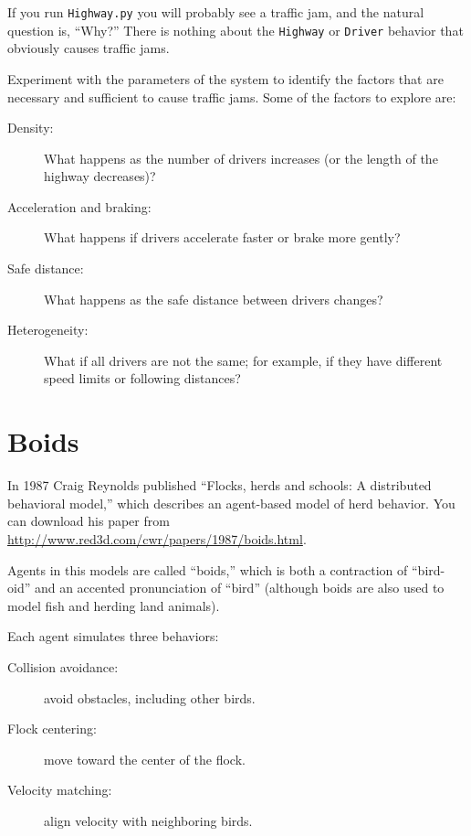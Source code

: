 \documentclass[10pt]{book}
\begin{document}
If you run {\tt Highway.py} you will probably see a traffic jam,
and the natural question is, ``Why?''  There is nothing about the
{\tt Highway} or {\tt Driver} behavior that obviously causes
traffic jams.

\begin{exercise}

Experiment with the parameters of the system to identify the factors
that are necessary and sufficient to cause traffic jams.  Some of
the factors to explore are:

\begin{description}

\item[Density:] What happens as the number of drivers increases (or
the length of the highway decreases)?

\item[Acceleration and braking:]  What happens if drivers accelerate
faster or brake more gently?

\item[Safe distance:] What happens as the safe distance between drivers
changes?

\item[Heterogeneity:] What if all drivers are not the same; for
example, if they have different speed limits or following distances?

\end{description}

\end{exercise}


\section{Boids}

In 1987 Craig Reynolds published ``Flocks, herds and
schools: A distributed behavioral model,'' which describes an
agent-based model of herd behavior.  You can download his
paper from \url{http://www.red3d.com/cwr/papers/1987/boids.html}.

Agents in this models are called ``boids,'' which is both a
contraction of ``bird-oid'' and an accented pronunciation of ``bird''
(although boids are also used to model fish and herding land animals).

Each agent simulates three behaviors:

\begin{description}

\item[Collision avoidance:] avoid obstacles, including other birds.

\item[Flock centering:] move toward the center of the flock.

\item[Velocity matching:] align velocity with neighboring birds.

\end{description}
\end{document}
